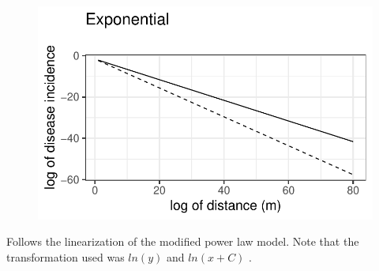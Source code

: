 \documentclass[
  letterpaper,
  DIV=11,
  numbers=noendperiod]{scrreprt}
\begin{document}
\begin{figure}[H]

{\centering \includegraphics{./spatial-models_files/figure-pdf/unnamed-chunk-10-1.pdf}

}

\end{figure}

Follows the linearization of the modified power law model. Note that the
transformation used was \(ln(y)\) and \(ln(x+C)\) .
\end{document}
